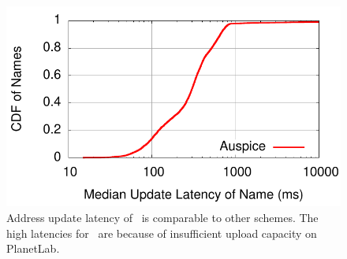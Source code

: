 {\begin{figure}[t]
\begin{minipage}[b]{0.3\linewidth}
\centering
\includegraphics[scale=0.45]{auspice/graph/system-exp/cdf-names-median-update.pdf}
\caption{Address update latency of \auspice\ is comparable to other schemes. The high latencies for \replicateall\ are because of insufficient upload capacity on PlanetLab.}
\label{fig:udpates}
\end{minipage}
\vspace{-0.15in}
\end{figure}
}


